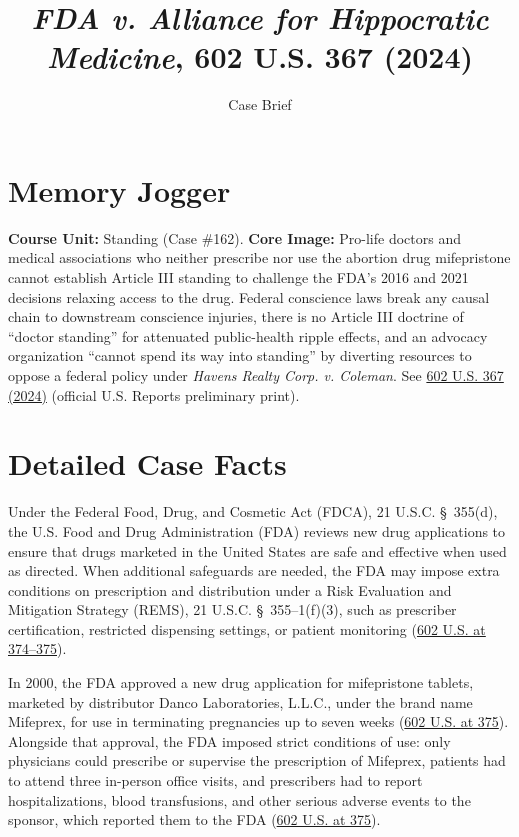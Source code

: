 \documentclass[12pt]{article}
\title{\textit{FDA v. Alliance for Hippocratic Medicine}, 602 U.S. 367 (2024)}
\author{Case Brief}
\date{}
\begin{document}
\maketitle

\section{Memory Jogger}

\textbf{Course Unit:} Standing (Case \#162). \textbf{Core Image:} Pro-life doctors and medical associations who neither prescribe nor use the abortion drug mifepristone cannot establish Article III standing to challenge the FDA's 2016 and 2021 decisions relaxing access to the drug. Federal conscience laws break any causal chain to downstream conscience injuries, there is no Article III doctrine of ``doctor standing'' for attenuated public-health ripple effects, and an advocacy organization ``cannot spend its way into standing'' by diverting resources to oppose a federal policy under \textit{Havens Realty Corp. v. Coleman}. See \href{https://www.supremecourt.gov/opinions/23pdf/602us1r35_bqmd.pdf}{602 U.S. 367 (2024)} (official U.S. Reports preliminary print).

\section{Detailed Case Facts}

Under the Federal Food, Drug, and Cosmetic Act (FDCA), 21 U.S.C. \S~355(d), the U.S. Food and Drug Administration (FDA) reviews new drug applications to ensure that drugs marketed in the United States are safe and effective when used as directed. When additional safeguards are needed, the FDA may impose extra conditions on prescription and distribution under a Risk Evaluation and Mitigation Strategy (REMS), 21 U.S.C. \S~355--1(f)(3), such as prescriber certification, restricted dispensing settings, or patient monitoring (\href{https://www.supremecourt.gov/opinions/23pdf/602us1r35_bqmd.pdf}{602 U.S. at 374--375}).

In 2000, the FDA approved a new drug application for mifepristone tablets, marketed by distributor Danco Laboratories, L.L.C., under the brand name Mifeprex, for use in terminating pregnancies up to seven weeks (\href{https://www.supremecourt.gov/opinions/23pdf/602us1r35_bqmd.pdf}{602 U.S. at 375}). Alongside that approval, the FDA imposed strict conditions of use: only physicians could prescribe or supervise the prescription of Mifeprex, patients had to attend three in-person office visits, and prescribers had to report hospitalizations, blood transfusions, and other serious adverse events to the sponsor, which reported them to the FDA (\href{https://www.supremecourt.gov/opinions/23pdf/602us1r35_bqmd.pdf}{602 U.S. at 375}).
\end{document}
